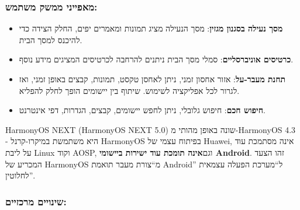 \subsubsection*{מאפייני ממשק משתמש:}

\begin{itemize}
  \item \textbf{מסך נעילה בסגנון מגזין}: מסך הנעילה מציג תמונות ומאמרים יפים, החלק הצידה כדי להיכנס למסך הבית.
  \item \textbf{כרטיסים אוניברסליים}: סמלי מסך הבית ניתנים להרחבה לכרטיסים המציגים מידע נוסף.
  \item \textbf{תחנת מעבר-על}: אזור אחסון זמני, ניתן לאחסן טקסט, תמונות, קבצים באופן זמני, ואז לגרור לכל אפליקציה לשימוש. שיתוף בין יישומים הופך לחלק להפליא.
  \item \textbf{חיפוש חכם}: חיפוש גלובלי, ניתן לחפש יישומים, קבצים, הגדרות, דפי אינטרנט.
\end{itemize}


HarmonyOS NEXT (HarmonyOS NEXT 5.0) שונה באופן מהותי מ-HarmonyOS 4.3 - היא משתמשת במיקרו-קרנל HarmonyOS בפיתוח עצמי של Huawei, אינה מסתמכת עוד על ליבת Linux וקוד AOSP, וגם\textbf{אינה תומכת עוד ישירות ביישומי Android}. זהו הצעד המכריע של HarmonyOS מ“צורת מעבר תואמת Android” ל“מערכת הפעלה עצמאית לחלוטין”.

\subsubsection*{שינויים מרכזיים:}

